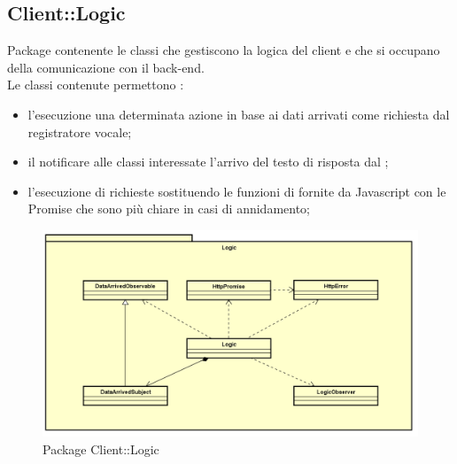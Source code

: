 \subsection{Client::Logic}
Package contenente le classi che gestiscono la logica del client e che si occupano della comunicazione con il back-end.\\ Le classi contenute permettono : \begin{itemize} \item l'esecuzione una determinata azione in base ai dati arrivati come richiesta dal registratore vocale; \item il notificare alle classi interessate l'arrivo del testo di risposta dal ; \item l'esecuzione di richieste  sostituendo le funzioni di  fornite da Javascript con le Promise che sono più chiare in casi di annidamento; \end{itemize}
\begin{figure}[h] \centering \includegraphics[width=\textwidth,height=\textheight,keepaspectratio]{images/diagrams/client/Client/Logic.png}
	\caption{Package Client::Logic}
\end{figure}
\newpage


